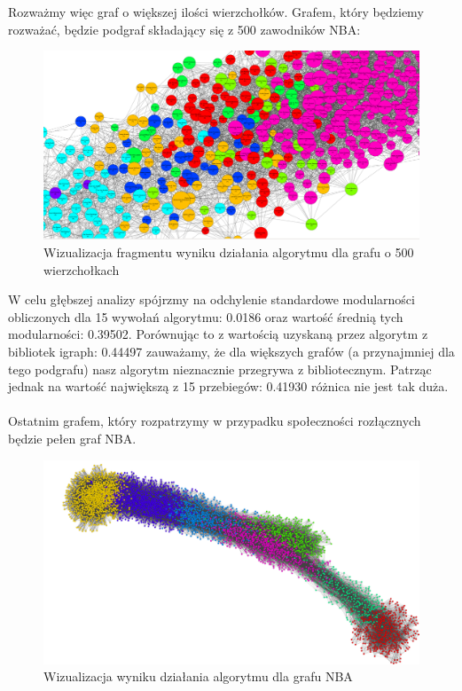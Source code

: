 \documentclass{article}
\begin{document}
Rozważmy więc graf o większej ilości wierzchołków. Grafem, który będziemy rozważać, będzie podgraf składający się z 500 zawodników NBA:

\begin{figure}[H]
\centering
\includegraphics[width=\textwidth]{images/pw_img2.png}
\caption{Wizualizacja fragmentu wyniku działania algorytmu dla grafu o 500 wierzchołkach}
\end{figure}

W celu głębszej analizy spójrzmy na odchylenie standardowe modularności obliczonych dla 15 wywołań algorytmu: 0.0186 oraz wartość średnią tych modularności: 0.39502. Porównując to z wartością uzyskaną przez algorytm z bibliotek igraph: 0.44497 zauważamy, że dla większych grafów (a przynajmniej dla tego podgrafu) nasz algorytm nieznacznie przegrywa z bibliotecznym. Patrząc jednak na wartość największą z 15 przebiegów: 0.41930 różnica nie jest tak duża.\\\\

Ostatnim grafem, który rozpatrzymy w przypadku społeczności rozłącznych będzie pełen graf NBA. 	

\begin{figure}[H]
\centering
\includegraphics[width=\textwidth]{images/pw_img3.png}
\caption{Wizualizacja wyniku działania algorytmu dla grafu NBA}
\end{figure}
\end{document}
